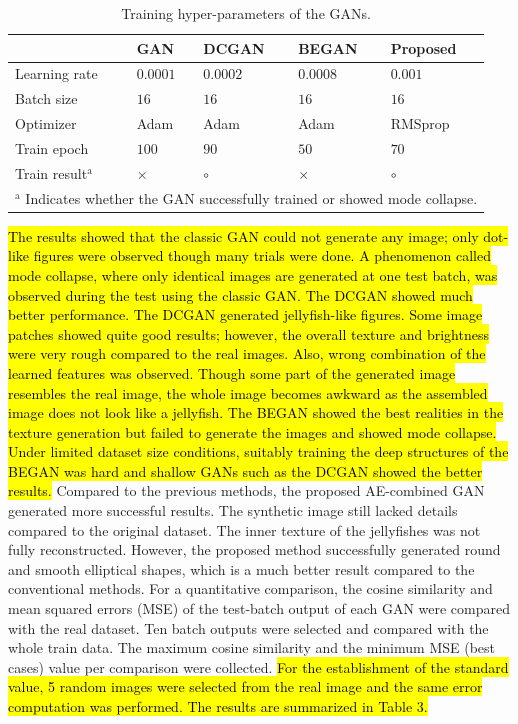 \documentclass{ieeeaccess}
\begin{document}
\begin{table}
\caption{Training hyper-parameters of the GANs.}
\label{table}
\setlength{\tabcolsep}{3pt}
\begin{tabular}{|p{45pt}|p{40pt}|p{40pt}|p{40pt}|p{40pt}|}
\hline
& 
GAN& 
DCGAN&
BEGAN&
Proposed\\

\hline
Learning rate & 
$0.0001 $& 
$0.0002 $& 
$0.0008 $& 
$0.001 $\\
Batch size& 
$16 $& 
$16 $& 
$16 $& 
$16 $\\
Optimizer& 
Adam& 
Adam& 
Adam& 
RMSprop\\
Train epoch& 
$100 $& 
$90 $& 
$50 $& 
$70 $\\
Train result$^{\mathrm{a}}$& 
$\times$& 
$\circ$& 
$\times$& 
$\circ$\\

\hline
\multicolumn{5}{p{233pt}}{$^{\mathrm{a}}$
Indicates whether the GAN successfully trained or showed mode collapse.}\\
\end{tabular}
\label{tab1}
\end{table}

\hl{The results showed that the classic GAN could not generate any image; only dot-like figures were observed though many trials were done. A phenomenon called mode collapse, where only identical images are generated at one test batch, was observed during the test using the classic GAN. The DCGAN showed much better performance. The DCGAN generated jellyfish-like figures. Some image patches showed quite good results; however, the overall texture and brightness were very rough compared to the real images. Also, wrong combination of the learned features was observed. Though some part of the generated image resembles the real image, the whole image becomes awkward as the assembled image does not look like a jellyfish. The BEGAN showed the best realities in the texture generation but failed to generate the images and showed mode collapse. Under limited dataset size conditions, suitably training the deep structures of the BEGAN was hard and shallow GANs such as the DCGAN showed the better results.} Compared to the previous methods, the proposed AE-combined GAN generated more successful results. The synthetic image still lacked details compared to the original dataset. The inner texture of the jellyfishes was not fully reconstructed. However, the proposed method successfully generated round and smooth elliptical shapes, which is a much better result compared to the conventional methods. For a quantitative comparison, the cosine similarity and mean squared errors (MSE) of the test-batch output of each GAN were compared with the real dataset. Ten batch outputs were selected and compared with the whole train data. The maximum cosine similarity and the minimum MSE (best cases) value per comparison were collected. \hl{For the establishment of the standard value, 5 random images were selected from the real image and the same error computation was performed. The results are summarized in Table 3.}
\end{document}
